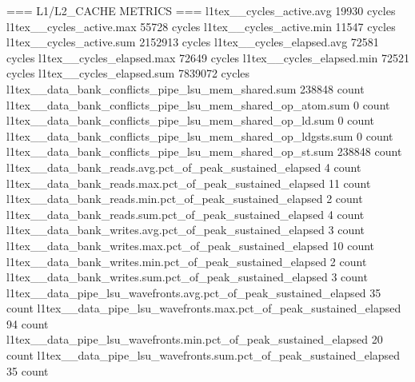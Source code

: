 === L1/L2_CACHE METRICS ===
l1tex__cycles_active.avg                                                                   19930 cycles
l1tex__cycles_active.max                                                                   55728 cycles
l1tex__cycles_active.min                                                                   11547 cycles
l1tex__cycles_active.sum                                                                 2152913 cycles
l1tex__cycles_elapsed.avg                                                                  72581 cycles
l1tex__cycles_elapsed.max                                                                  72649 cycles
l1tex__cycles_elapsed.min                                                                  72521 cycles
l1tex__cycles_elapsed.sum                                                                7839072 cycles
l1tex__data_bank_conflicts_pipe_lsu_mem_shared.sum                                        238848 count
l1tex__data_bank_conflicts_pipe_lsu_mem_shared_op_atom.sum                                     0 count
l1tex__data_bank_conflicts_pipe_lsu_mem_shared_op_ld.sum                                       0 count
l1tex__data_bank_conflicts_pipe_lsu_mem_shared_op_ldgsts.sum                                   0 count
l1tex__data_bank_conflicts_pipe_lsu_mem_shared_op_st.sum                                  238848 count
l1tex__data_bank_reads.avg.pct_of_peak_sustained_elapsed                                       4 count
l1tex__data_bank_reads.max.pct_of_peak_sustained_elapsed                                      11 count
l1tex__data_bank_reads.min.pct_of_peak_sustained_elapsed                                       2 count
l1tex__data_bank_reads.sum.pct_of_peak_sustained_elapsed                                       4 count
l1tex__data_bank_writes.avg.pct_of_peak_sustained_elapsed                                      3 count
l1tex__data_bank_writes.max.pct_of_peak_sustained_elapsed                                     10 count
l1tex__data_bank_writes.min.pct_of_peak_sustained_elapsed                                      2 count
l1tex__data_bank_writes.sum.pct_of_peak_sustained_elapsed                                      3 count
l1tex__data_pipe_lsu_wavefronts.avg.pct_of_peak_sustained_elapsed                             35 count
l1tex__data_pipe_lsu_wavefronts.max.pct_of_peak_sustained_elapsed                             94 count
l1tex__data_pipe_lsu_wavefronts.min.pct_of_peak_sustained_elapsed                             20 count
l1tex__data_pipe_lsu_wavefronts.sum.pct_of_peak_sustained_elapsed                             35 count
